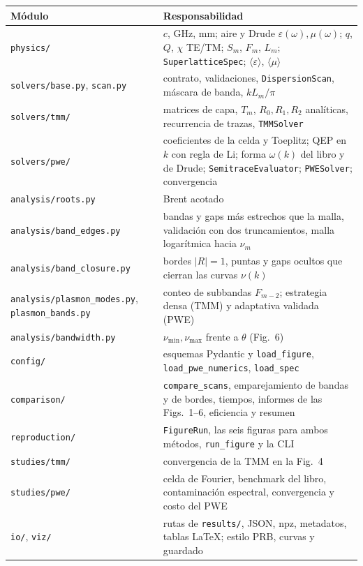 \documentclass[11pt,a4paper]{article}
\begin{document}
{\footnotesize
\begin{center}
\begin{tabular}{p{4.6cm}p{10.4cm}}
\toprule
Módulo & Responsabilidad \\
\midrule
\texttt{physics/} & \(c\), GHz, mm; aire y Drude \(\varepsilon(\omega),\mu(\omega)\); \(q\), \(Q\), \(\chi\) TE/TM; \(S_m\), \(F_m\), \(L_m\); \texttt{SuperlatticeSpec}; \(\langle\varepsilon\rangle\), \(\langle\mu\rangle\) \\
\texttt{solvers/base.py}, \texttt{scan.py} & contrato, validaciones, \texttt{DispersionScan}, máscara de banda, \(kL_m/\pi\) \\
\texttt{solvers/tmm/} & matrices de capa, \(T_m\), \(R_0,R_1,R_2\) analíticas, recurrencia de trazas, \texttt{TMMSolver} \\
\texttt{solvers/pwe/} & coeficientes de la celda y Toeplitz; QEP en \(k\) con regla de Li; forma \(\omega(k)\) del libro y de Drude; \texttt{SemitraceEvaluator}; \texttt{PWESolver}; convergencia \\
\texttt{analysis/roots.py} & Brent acotado \\
\texttt{analysis/band\_edges.py} & bandas y gaps más estrechos que la malla, validación con dos truncamientos, malla logarítmica hacia \(\nu_m\) \\
\texttt{analysis/band\_closure.py} & bordes \(|R|=1\), puntas y gaps ocultos que cierran las curvas \(\nu(k)\) \\
\texttt{analysis/plasmon\_modes.py}, \texttt{plasmon\_bands.py} & conteo de subbandas \(F_{m-2}\); estrategia densa (TMM) y adaptativa validada (PWE) \\
\texttt{analysis/bandwidth.py} & \(\nu_{\min},\nu_{\max}\) frente a \(\theta\) (Fig.~6) \\
\texttt{config/} & esquemas Pydantic y \texttt{load\_figure}, \texttt{load\_pwe\_numerics}, \texttt{load\_spec} \\
\texttt{comparison/} & \texttt{compare\_scans}, emparejamiento de bandas y de bordes, tiempos, informes de las Figs.~1--6, eficiencia y resumen \\
\texttt{reproduction/} & \texttt{FigureRun}, las seis figuras para ambos métodos, \texttt{run\_figure} y la CLI \\
\texttt{studies/tmm/} & convergencia de la TMM en la Fig.~4 \\
\texttt{studies/pwe/} & celda de Fourier, benchmark del libro, contaminación espectral, convergencia y costo del PWE \\
\texttt{io/}, \texttt{viz/} & rutas de \texttt{results/}, JSON, npz, metadatos, tablas LaTeX; estilo PRB, curvas y guardado \\
\bottomrule
\end{tabular}
\end{center}
}
\end{document}
